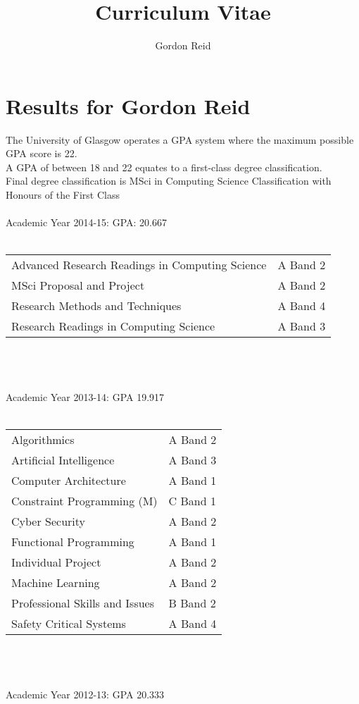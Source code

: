 \documentclass[10pt,a4paper]{article}
\title{Curriculum Vitae}
\author{Gordon Reid}
\begin{document}
\section*{Results for Gordon Reid}
The University of Glasgow operates a GPA system where the maximum possible
GPA score is 22.\\
A GPA of between 18 and 22 equates to a first-class degree classification.\\
Final degree classification is MSci in Computing Science Classification with Honours of the First Class\\\\
Academic Year 2014-15: GPA: 20.667\\\\
\begin{tabular}{p{10cm}l}
    Advanced Research Readings in Computing Science & A Band 2\\
    MSci Proposal and Project & A Band 2\\
    Research Methods and Techniques & A Band 4\\
    Research Readings in Computing Science & A Band 3\\
\end{tabular}
\\\\\\
Academic Year 2013-14: GPA 19.917\\\\
\begin{tabular}{p{10cm}l}
    Algorithmics & A Band 2\\
    Artificial Intelligence & A Band 3\\
    Computer Architecture & A Band 1\\
    Constraint Programming (M) & C Band 1\\
    Cyber Security & A Band 2\\
    Functional Programming & A Band 1\\
    Individual Project & A Band 2\\
    Machine Learning & A Band 2\\
    Professional Skills and Issues & B Band 2\\
    Safety Critical Systems & A Band 4\\
\end{tabular}
\\\\\\
Academic Year 2012-13: GPA 20.333\\\\
\end{document}
